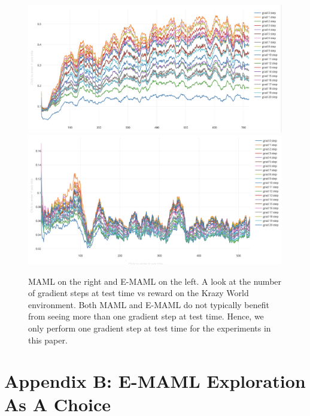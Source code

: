 \documentclass{article} %
\begin{document}
\begin{figure}[t]
\begin{center}
\includegraphics[scale=0.16]{bradly_curves/emaml-20-0.png}%
\includegraphics[scale=0.16]{bradly_curves/maml-20-0.png}
\end{center}
\caption{MAML on the right and E-MAML on the left. A look at the number of gradient steps at test time vs reward on the Krazy World environment. Both MAML and E-MAML do not typically benefit from seeing more than one gradient step at test time. Hence, we only perform one gradient step at test time for the experiments in this paper.}
\label{fig:maml-grad-steps}
\end{figure} 


\section{Appendix B: E-MAML Exploration As A Choice} 
\end{document}
